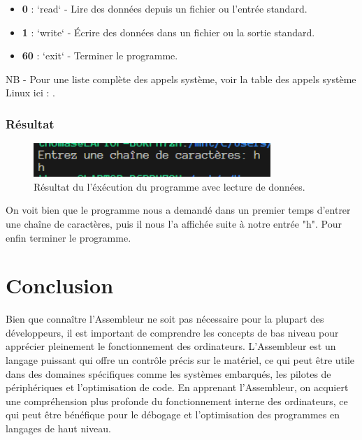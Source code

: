 \documentclass[a4paper, 12pt]{report}
\begin{document}
\begin{itemize}
  \item \textbf{0} : `read` - Lire des données depuis un fichier ou l'entrée standard.
  \item \textbf{1} : `write` - Écrire des données dans un fichier ou la sortie standard.
  \item \textbf{60} : `exit` - Terminer le programme.
\end{itemize}

NB - Pour une liste complète des appels système, voir la table des appels système Linux ici : \cite{3}.

\subsection{Résultat}

\begin{figure}[H]
  \centering
  \includegraphics[width=0.8\textwidth]{imgs/execLEC.png}
  \caption{Résultat du l'éxécution du programme avec lecture de données.}
\end{figure}

On voit bien que le programme nous a demandé dans un premier temps d'entrer une chaîne de caractères, puis il nous l'a affichée suite à notre entrée "h". Pour enfin terminer le programme.

\chapter{Conclusion}
Bien que connaître l'Assembleur ne soit pas nécessaire pour la plupart des développeurs, il est important de comprendre les concepts de bas niveau pour apprécier pleinement le fonctionnement des ordinateurs. L'Assembleur est un langage puissant qui offre un contrôle précis sur le matériel, ce qui peut être utile dans des domaines spécifiques comme les systèmes embarqués, les pilotes de périphériques et l'optimisation de code. En apprenant l'Assembleur, on acquiert une compréhension plus profonde du fonctionnement interne des ordinateurs, ce qui peut être bénéfique pour le débogage et l'optimisation des programmes en langages de haut niveau.

\printbibliography
\end{document}

